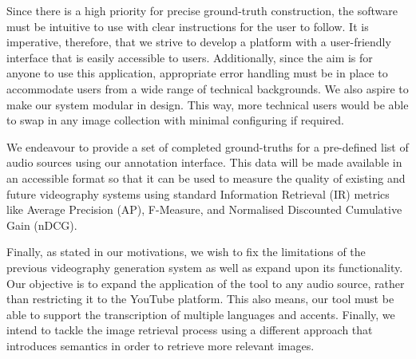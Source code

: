 \documentclass{l4proj}
\begin{document}
Since there is a high priority for precise ground-truth construction, the software must be intuitive to use with clear instructions for the user to follow. It is imperative, therefore, that we strive to develop a platform with a user-friendly interface that is easily accessible to users. Additionally, since the aim is for anyone to use this application, appropriate error handling must be in place to accommodate users from a wide range of technical backgrounds. We also aspire to make our system modular in design. This way, more technical users would be able to swap in any image collection with minimal configuring if required.

We endeavour to provide a set of completed ground-truths for a pre-defined list of audio sources using our annotation interface. This data will be made available in an accessible format so that it can be used to measure the quality of existing and future videography systems using standard Information Retrieval (IR) metrics like Average Precision (AP), F-Measure, and Normalised Discounted Cumulative Gain (nDCG).

Finally, as stated in our motivations, we wish to fix the limitations of the previous videography generation system as well as expand upon its functionality. Our objective is to expand the application of the tool to any audio source, rather than restricting it to the YouTube platform. This also means, our tool must be able to support the transcription of multiple languages and accents. Finally, we intend to tackle the image retrieval process using a different approach that introduces semantics in order to retrieve more relevant images.




\end{document}
